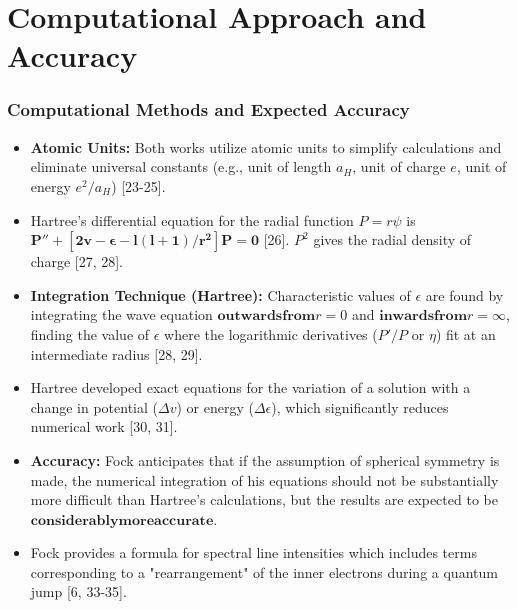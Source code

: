 \section{Computational Approach and Accuracy}
\begin{frame}
    \frametitle{Computational Methods and Expected Accuracy}
    \begin{itemize}
        \item \textbf{Atomic Units:} Both works utilize atomic units to simplify calculations and eliminate universal constants (e.g., unit of length $a_H$, unit of charge $e$, unit of energy $e^2/a_H$) [23-25].
        \item Hartree's differential equation for the radial function $P=r\psi$ is $\mathbf{P'' + [2v - \epsilon - l(l+1)/r^2]P = 0}$ [26]. $P^2$ gives the radial density of charge [27, 28].
        \item \textbf{Integration Technique (Hartree):} Characteristic values of $\epsilon$ are found by integrating the wave equation $\mathbf{outwards from} r=0$ and $\mathbf{inwards from} r=\infty$, finding the value of $\epsilon$ where the logarithmic derivatives ($P'/P$ or $\eta$) fit at an intermediate radius [28, 29].
        \item Hartree developed exact equations for the variation of a solution with a change in potential ($\Delta v$) or energy ($\Delta \epsilon$), which significantly reduces numerical work [30, 31].
        \item \textbf{Accuracy:} Fock anticipates that if the assumption of spherical symmetry is made, the numerical integration of his equations should not be substantially more difficult than Hartree's calculations, but the results are expected to be $\mathbf{considerably more accurate}$.
        \item Fock provides a formula for spectral line intensities which includes terms corresponding to a "rearrangement" of the inner electrons during a quantum jump [6, 33-35].
    \end{itemize}
\end{frame}


